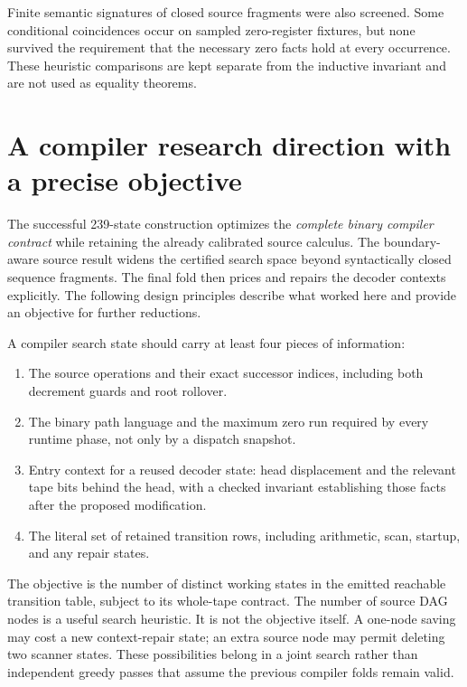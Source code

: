 \documentclass[11pt,a4paper]{article}
\theoremstyle{definition}
\begin{document}
Finite semantic signatures of closed source fragments were also screened.
Some conditional coincidences occur on sampled zero-register fixtures, but
none survived the requirement that the necessary zero facts hold at every
occurrence.  These heuristic comparisons are kept separate from the
inductive invariant and are not used as equality theorems.







\section{A compiler research direction with a precise objective}
\label{sec:direction}

The successful 239-state construction optimizes the \emph{complete binary
compiler contract} while retaining the already calibrated source calculus.
The boundary-aware source result widens the certified search space beyond
syntactically closed sequence fragments.  The final fold then prices and
repairs the decoder contexts explicitly.  The following design principles
describe what worked here and provide an objective for further reductions.

A compiler search state should carry at least four pieces of information:
\begin{enumerate}
\item The source operations and their exact successor indices, including
both decrement guards and root rollover.
\item The binary path language and the maximum zero run required by every
runtime phase, not only by a dispatch snapshot.
\item Entry context for a reused decoder state: head displacement and the
relevant tape bits behind the head, with a checked invariant establishing
those facts after the proposed modification.
\item The literal set of retained transition rows, including arithmetic,
scan, startup, and any repair states.
\end{enumerate}

The objective is the number of distinct working states in the emitted
reachable transition table, subject to its whole-tape contract.  The
number of source DAG nodes is a useful search heuristic.  It is not the
objective itself.  A one-node saving may cost a new context-repair state;
an extra source node may permit deleting two scanner states.  These
possibilities belong in a joint search rather than independent greedy
passes that assume the previous compiler folds remain valid.
\end{document}
